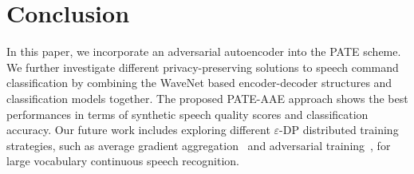 \documentclass[a4paper]{article}
\begin{document}
\section{Conclusion}
In this paper, we incorporate an adversarial autoencoder into the PATE scheme. We further investigate different privacy-preserving solutions to speech command classification by combining the WaveNet based encoder-decoder structures and classification models together. The proposed PATE-AAE approach shows the best performances in terms of synthetic speech quality scores and classification accuracy. Our future work includes exploring different $\varepsilon$-DP distributed training strategies, such as average gradient aggregation~\cite{chen2020gs} and adversarial training~\cite{yang2020characterizing}, for large vocabulary continuous speech recognition.

\clearpage



\end{document}
